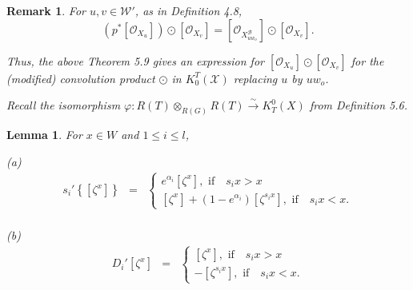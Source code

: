 \documentclass{article}
\newtheorem{lemma}[theorem]{Lemma}
\newtheorem{remark}[theorem]{Remark}
\def\X{\mathcal{X}}
\def\B{\mathcal{B}}
\def\W{\mathcal{W}}
\def\ref#1{#1}
\begin{document}
\begin{remark}\rm{
For $u,v\in \W'$, as in Definition \ref{4.8}, 
$$
\left(p^*\left[ \mathcal{O}_{X_u}\right]\right) \odot \left[\mathcal{O}_{X_v}\right] =\left[\mathcal{O}_{X^\B_{uw_o}}\right] \odot \left[\mathcal{O}_{X_v}\right].
$$

Thus, the above Theorem \ref{5.9} gives an expression for $\left[ \mathcal{O}_{X_u}\right] \odot \left[\mathcal{O}_{X_v}\right]$  for the (modified) convolution product $\odot$ in $K^T_0(\X)$ replacing $u$ by $uw_o$. 

Recall the isomorphism $\varphi: R(T) \otimes_{R(G)}R(T)\overset{\sim}{\rightarrow} K^0_T(X)$ from Definition \ref{5.6}.} 
\end{remark}


\begin{lemma}\label{5.11}
For $x\in W$ and $1\leq i \leq l$,

(a) \begin{eqnarray*} s_i'\left\{\left[\zeta^x\right]\right\}&=& \left\{ 
\begin{array}{l}
\displaystyle e^{\alpha_i}\left[\zeta^x\right],\mbox{ if} \quad s_ix>x\\
\displaystyle \left[\zeta^x\right] + \left(1-e^{\alpha_i}\right) \left[\zeta^{s_i x}\right], \mbox{ if}\quad s_ix<x.
\end{array}\right.\\
\end{eqnarray*}

(b) \begin{eqnarray*} D_i'\left[\zeta^x\right] &=& 
\left\{ 
\begin{array}{l}
\displaystyle\left[\zeta^x\right],\mbox{ if} \quad s_ix>x\\
\displaystyle- \left[\zeta^{s_ix}\right] , \mbox{ if}\quad s_ix<x.
\end{array}\right.
\end{eqnarray*}
\end{lemma}
\end{document}
